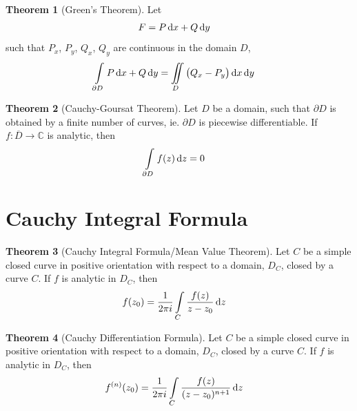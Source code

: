 \documentclass[titlepage, fleqn, a4paper, 12pt, twoside]{article}
\theoremstyle{definition}
\theoremstyle{theorem}
\newtheorem{theorem}{Theorem}
\begin{document}
\begin{theorem}[Green's Theorem]
	Let
	\begin{align*}
		F &= P \dif x + Q \dif y
	\end{align*}
	such that $P_x$, $P_y$, $Q_x$, $Q_y$ are continuous in the domain $D$,
	\begin{align*}
		\int\limits_{\partial D} P \dif x + Q \dif y &= \iint\limits_{D} \left( Q_x - P_y \right) \dif x \dif y
	\end{align*}
	\label{thm:Green's_Theorem}
\end{theorem}

\begin{theorem}[Cauchy-Goursat Theorem]
	Let $D$ be a domain, such that $\partial D$ is obtained by a finite number of curves, ie. $\partial D$ is piecewise differentiable.
	If $f : \overline{D} \to \mathbb{C}$ is analytic, then
	\begin{align*}
		\int\limits_{\partial D} f(z) \dif z &= 0
	\end{align*}
	\label{thm:Cauchy-Goursat_Theorem}
\end{theorem}

\section{Cauchy Integral Formula}

\begin{theorem}[Cauchy Integral Formula/Mean Value Theorem]
	Let $C$ be a simple closed curve in positive orientation with respect to a domain, $D_C$, closed by a curve $C$.
	If $f$ is analytic in $D_C$, then
	\begin{align*}
		f(z_0) &= \frac{1}{2 \pi i} \int\limits_{C} \frac{f(z)}{z - z_0} \dif z
	\end{align*}
	\label{thm:Cauchy_Integral_Formula/Mean_Value_Theorem}
\end{theorem}

\begin{theorem}[Cauchy Differentiation Formula]
	Let $C$ be a simple closed curve in positive orientation with respect to a domain, $D_C$, closed by a curve $C$.
	If $f$ is analytic in $D_C$, then
	\begin{align*}
		f^{(n)}(z_0) &= \frac{1}{2 \pi i} \int\limits_{C} \frac{f(z)}{(z - z_0)^{n + 1}} \dif z
	\end{align*}
	\label{thm:Cauchy_Differentiation_Formula}
\end{theorem}
\end{document}
